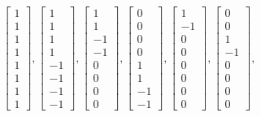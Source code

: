 \documentclass{article}
\begin{document}
\begin{align*}
\begin{bmatrix} 1 \\ 1 \\ 1 \\ 1 \\ 1 \\ 1 \\ 1 \\ 1 \end{bmatrix},
\begin{bmatrix} 1 \\ 1 \\ 1 \\ 1 \\ -1 \\ -1 \\ -1 \\ -1 \end{bmatrix},
\begin{bmatrix} 1 \\ 1 \\ -1 \\ -1 \\ 0 \\ 0 \\ 0 \\ 0 \end{bmatrix},
\begin{bmatrix} 0 \\ 0 \\ 0 \\ 0 \\ 1 \\ 1 \\ -1 \\ -1 \end{bmatrix}, 
\begin{bmatrix} 1 \\ -1 \\ 0 \\ 0 \\ 0 \\ 0 \\ 0 \\ 0 \end{bmatrix},
\begin{bmatrix} 0 \\ 0 \\ 1 \\ -1 \\ 0 \\ 0 \\ 0 \\ 0 \end{bmatrix},

\end{align*}
\end{document}
